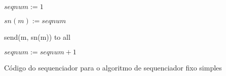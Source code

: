 \begin{algorithm}
\DontPrintSemicolon

$seqnum := 1$

 {
    $sn(m) := seqnum$

    send(m, sn(m)) to all

    $seqnum := seqnum + 1$
}

\caption{Código do sequenciador para o algoritmo de sequenciador fixo simples}
\label{algo:simple-fixed-sequencer}
\end{algorithm}
